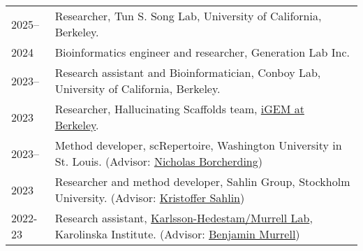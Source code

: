 
\begin{longtable}[l]{@{}p{} p{}}

    2025-- & Researcher, Tun S. Song Lab, University of California, Berkeley. \\

    2024 & Bioinformatics engineer and researcher, Generation Lab Inc. \\

    2023-- & Research assistant and Bioinformatician, Conboy Lab, University of California, Berkeley.\\

    2023 & Researcher, Hallucinating Scaffolds team, \href{https://igem.studentorg.berkeley.edu/teams/hallucinating-scaffolds/}{iGEM at Berkeley}. \\

    2023-- & Method developer, scRepertoire, Washington University in St. Louis. (Advisor: \href{https://www.borch.dev/}{Nicholas Borcherding})\\

    2023 & Researcher and method developer, Sahlin Group, Stockholm University. (Advisor: \href{https://www.scilifelab.se/researchers/kristoffer-sahlin/}{Kristoffer Sahlin}) \\

    2022-23 & Research assistant, \href{https://ki.se/en/people/benjamin-murrell}{Karlsson-Hedestam/Murrell Lab}, Karolinska Institute. (Advisor: \href{https://ki.se/en/people/benjamin-murrell}{Benjamin Murrell}) \\

\end{longtable}
